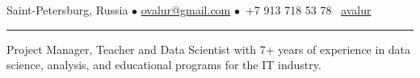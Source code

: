\documentclass[11pt]{article}
\begin{document}
%

\vspace{0.5em}

\noindent Saint-Petersburg, Russia $\bullet$ \href{mailto:ovalur@gmail.com}{ovalur@gmail.com} %
$\bullet$~+7 913 718 53 78
\faGithub~\href{https://github.com/avalur}{avalur}

\vspace{0.5em}
\hrule
\vspace{0.5em}

Project Manager, Teacher and Data Scientist with 7+ years of experience in data science, analysis, and educational programs for the IT industry.

\vspace{0.5em}
\end{document}
